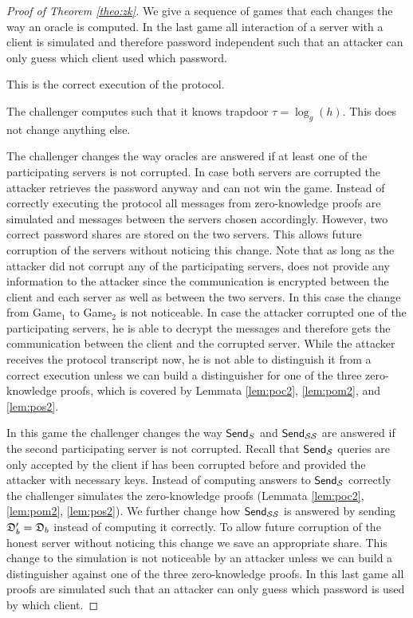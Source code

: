 \begin{proof}[Proof of Theorem \ref{theo:zk}]
We give a sequence of games that each changes the way an oracle is computed.
In the last game all interaction of a server with a client is simulated and therefore password independent such that an attacker can only guess which client used which password.

This is the correct execution of the protocol.

The challenger computes \crs such that it knows trapdoor $\tau=\log_g(h)$.
This does not change anything else.

The challenger changes the way \Execute oracles are answered if at least one of the participating servers is not corrupted.
In case both servers are corrupted the attacker retrieves the password anyway and can not win the game.
Instead of correctly executing the protocol all messages from zero-knowledge proofs are simulated and messages between the servers chosen accordingly.
However, two correct password shares are stored on the two servers.
This allows future corruption of the servers without noticing this change.
Note that as long as the attacker did not corrupt any of the participating servers, \Execute does not provide any information to the attacker since the communication is encrypted between the client and each server as well as between the two servers.
In this case the change from Game$_1$ to Game$_2$ is not noticeable.
In case the attacker corrupted one of the participating servers, he is able to decrypt the messages and therefore gets the communication between the client and the corrupted server.
While the attacker receives the protocol transcript now, he is not able to distinguish it from a correct execution unless we can build a distinguisher for one of the three zero-knowledge proofs, which is covered by Lemmata \ref{lem:poc2}, \ref{lem:pom2}, and \ref{lem:pos2}.

In this game the challenger changes the way $\mathsf{Send}_{S}$ and $\mathsf{Send}_{\mathcal{S}\mathcal{S}}$ are answered if the second participating server is not corrupted.
Recall that $\mathsf{Send}_\mathcal{S}$ queries are only accepted by the client if \Server has been corrupted before and provided the attacker with necessary keys.
Instead of computing answers to $\mathsf{Send}_\mathcal{S}$ correctly the challenger simulates the zero-knowledge proofs (Lemmata \ref{lem:poc2}, \ref{lem:pom2}, \ref{lem:pos2}).
We further change how $\mathsf{Send}_{\mathcal{S}\mathcal{S}}$ is answered by sending $\mathfrak{D}'_b=\mathfrak{D}_b$ instead of computing it correctly.
To allow future corruption of the honest server without noticing this change we save an appropriate share.
This change to the simulation is not noticeable by an attacker unless we can build a distinguisher against one of the three zero-knowledge proofs.
In this last game all proofs are simulated such that an attacker can only guess which password is used by which client.
\end{proof}



